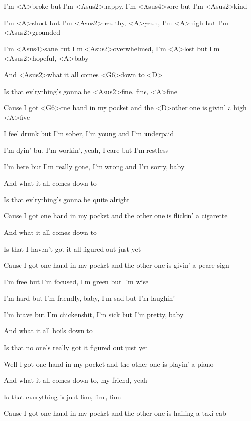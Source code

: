 

\zs
I'm <A>broke but I'm <Asus2>happy,
I'm <Asus4>sore but I'm <Asus2>kind

I'm <A>short but I'm <Asus2>healthy, <A>yeah,
I'm <A>high but I'm <Asus2>grounded

I'm <Asus4>sane but I'm <Asus2>overwhelmed,
I'm <A>lost but I'm <Asus2>hopeful, <A>baby
\ks

\zr
And <Asus2>what it all comes <G6>down to <D>

Is that ev'rything's gonna be <Asus2>fine, fine, <A>fine

Cause I got <G6>one hand in my pocket
and the <D>other one is givin' a high <A>five
\kr

\zs
I feel drunk but I'm sober,
I'm young and I'm underpaid

I'm dyin' but I'm workin', yeah,
I care but I'm restless

I'm here but I'm really gone,
I'm wrong and I'm sorry, baby
\ks

\zr
And what it all comes down to

Is that ev'rything's gonna be quite alright

Cause I got one hand in my pocket
and the other one is flickin' a cigarette
\kr

\zr
And what it all comes down to

Is that I haven't got it all figured out just yet

Cause I got one hand in my pocket
and the other one is givin' a peace sign
\kr

\zs
I'm free but I'm focused,
I'm green but I'm wise

I'm hard but I'm friendly, baby,
I'm sad but I'm laughin'

I'm brave but I'm chickenshit,
I'm sick but I'm pretty, baby
\ks

\zr
And what it all boils down to

Is that no one's really got it figured out just yet

Well I got one hand in my pocket
and the other one is playin' a piano
\kr

\zr
And what it all comes down to, my friend, yeah

Is that everything is just fine, fine, fine

Cause I got one hand in my pocket
and the other one is hailing a taxi cab
\kr

\kp
